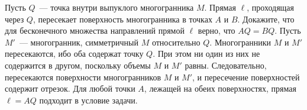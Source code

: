 \problem
Пусть $Q$~--- точка внутри выпуклого многогранника $M$.
Прямая $\ell$, проходящая через $Q$, пересекает поверхность многогранника в
точках $A$ и $B$.
Докажите, что для бесконечного множества направлений прямой $\ell$ верно, что
$AQ = BQ$.
\solution
Пусть $M'$~--- многогранник, симметричный $M$ относительно $Q$.
Многогранники $M$ и $M'$ пересекаются, ибо оба содержат точку $Q$.
При этом ни один из них не содержится в другом, поскольку объемы $M$ и $M'$
равны.
Следовательно, пересекаются поверхности многогранников $M$ и $M'$, и
пересечение поверхностей содержит отрезок.
Для любой точки $A$, лежащей на обеих поверхностях, прямая $\ell = AQ$ подходит
в условие задачи. 
\endproblem
